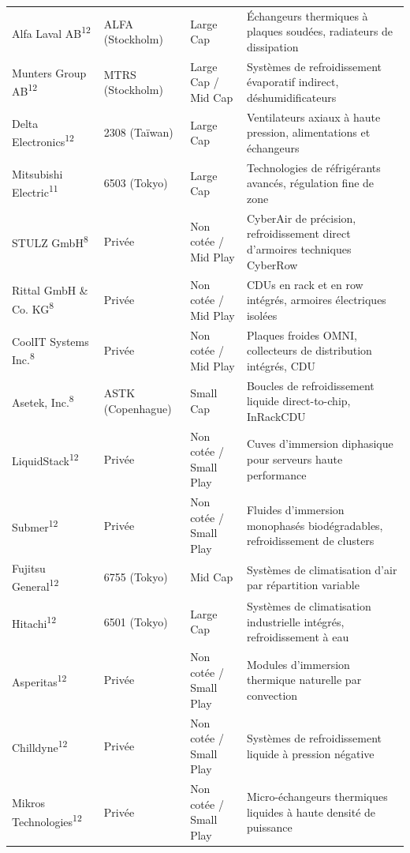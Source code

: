 \documentclass[11pt,a4paper]{article}
\begin{document}
\begin{longtable}{p{3cm} p{3.5cm} p{3cm} p{5cm}}
Alfa Laval AB\textsuperscript{12} & ALFA (Stockholm) & Large Cap & Échangeurs thermiques à plaques soudées, radiateurs de dissipation \\
Munters Group AB\textsuperscript{12} & MTRS (Stockholm) & Large Cap / Mid Cap & Systèmes de refroidissement évaporatif indirect, déshumidificateurs \\
Delta Electronics\textsuperscript{12} & 2308 (Taïwan) & Large Cap & Ventilateurs axiaux à haute pression, alimentations et échangeurs \\
Mitsubishi Electric\textsuperscript{11} & 6503 (Tokyo) & Large Cap & Technologies de réfrigérants avancés, régulation fine de zone \\
STULZ GmbH\textsuperscript{8} & Privée & Non cotée / Mid Play & CyberAir de précision, refroidissement direct d'armoires techniques CyberRow \\
Rittal GmbH \& Co. KG\textsuperscript{8} & Privée & Non cotée / Mid Play & CDUs en rack et en row intégrés, armoires électriques isolées \\
CoolIT Systems Inc.\textsuperscript{8} & Privée & Non cotée / Mid Play & Plaques froides OMNI, collecteurs de distribution intégrés, CDU \\
Asetek, Inc.\textsuperscript{8} & ASTK (Copenhague) & Small Cap & Boucles de refroidissement liquide direct-to-chip, InRackCDU \\
LiquidStack\textsuperscript{12} & Privée & Non cotée / Small Play & Cuves d'immersion diphasique pour serveurs haute performance \\
Submer\textsuperscript{12} & Privée & Non cotée / Small Play & Fluides d'immersion monophasés biodégradables, refroidissement de clusters \\
Fujitsu General\textsuperscript{12} & 6755 (Tokyo) & Mid Cap & Systèmes de climatisation d'air par répartition variable \\
Hitachi\textsuperscript{12} & 6501 (Tokyo) & Large Cap & Systèmes de climatisation industrielle intégrés, refroidissement à eau \\
Asperitas\textsuperscript{12} & Privée & Non cotée / Small Play & Modules d'immersion thermique naturelle par convection \\
Chilldyne\textsuperscript{12} & Privée & Non cotée / Small Play & Systèmes de refroidissement liquide à pression négative \\
Mikros Technologies\textsuperscript{12} & Privée & Non cotée / Small Play & Micro-échangeurs thermiques liquides à haute densité de puissance \\

\end{longtable}
\end{document}
